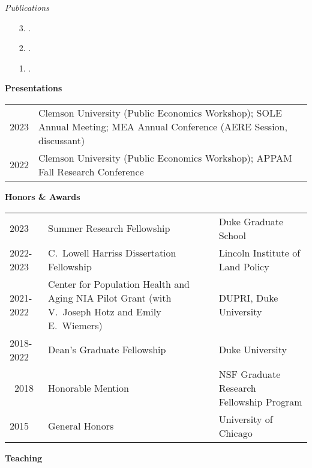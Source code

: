 \documentclass[12pt]{article}
\begin{document}
\vspace{1em}

\textit{Publications} 

\vspace{1em}

\begin{enumerate}
	\item [3.] .
	\item [2.]  .
	\item [1.] . 
\end{enumerate}


\vspace{1em}

\textbf{Presentations}

\vspace{1em}

\begin{tabular}{@{}lp{}}
2023 & Clemson University (Public Economics Workshop); SOLE Annual Meeting; MEA Annual Conference (AERE Session, discussant) \\
2022 & Clemson University (Public Economics Workshop); APPAM Fall Research Conference \\
\end{tabular}

\vspace{1em}

\textbf{Honors \& Awards} 

\vspace{1em}

\begin{tabular}{@{}lp{}p{}}
2023 & Summer Research Fellowship & Duke Graduate School \\
2022-2023 & C.\ Lowell Harriss Dissertation Fellowship & Lincoln Institute of Land Policy\\
2021-2022 & Center for Population Health and Aging NIA Pilot Grant  (with V.\ Joseph Hotz and Emily E.\ Wiemers) & DUPRI, Duke University \\
2018-2022 & Dean's Graduate Fellowship & Duke University \\\
2018 & Honorable Mention & NSF Graduate Research Fellowship Program \\
2015 & General Honors & University of Chicago
\end{tabular}


\vspace{1em}

\textbf{Teaching} 
\end{document}
